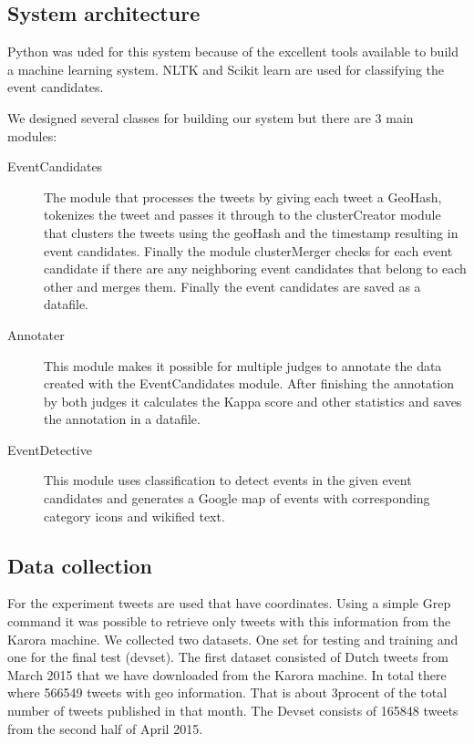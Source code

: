 \documentclass[
10pt, %
a4paper, %
oneside, %
headinclude,footinclude, %
BCOR5mm, %
]{scrartcl}
\begin{document}
\subsection{System architecture}
Python was uded for this system because of the excellent tools available to build a machine learning system. NLTK and Scikit learn are used for classifying the event candidates.

We designed several classes for building our system but there are 3 main modules:

\begin{description}

\item[EventCandidates] 
The module that processes the tweets by giving each tweet a GeoHash, tokenizes the tweet and passes it through to the clusterCreator module that clusters the tweets using the geoHash and the timestamp resulting in event candidates. Finally the module clusterMerger checks for each event candidate if there are any neighboring event candidates that belong to each other and merges them. Finally the event candidates are saved as a datafile.


\item[Annotater] 
This module makes it possible for multiple judges to annotate the data created with the EventCandidates module. After finishing the annotation by both judges it calculates the Kappa score and other statistics and saves the annotation in a datafile.


\item[EventDetective] 
This module uses classification to detect events in the given event candidates and generates a Google map of events with corresponding category icons and wikified text.


\end{description}

\subsection{Data collection}
For the experiment tweets are used that have coordinates. Using a simple Grep command it was possible to retrieve only tweets with this information from the Karora machine. We collected two datasets. One set for testing and training and one for the final test (devset). 
The first dataset consisted of Dutch tweets from March 2015 that we have downloaded from the Karora machine. In total there where 566549 tweets with geo information. That is about 3procent of the total number of tweets published in that month. The Devset consists of 165848 tweets from the second half of April 2015.
\end{document}
